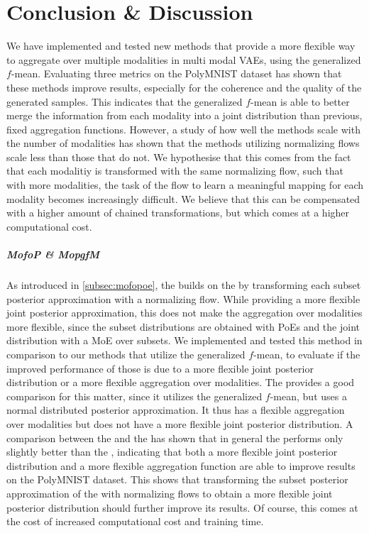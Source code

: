 \chapter{Conclusion \& Discussion}
We have implemented and tested new methods that provide a more flexible way to aggregate over multiple modalities in multi modal VAEs, using the generalized $f$-mean.
Evaluating three metrics on the PolyMNIST dataset has shown that these methods improve results, especially for the coherence and the quality of the generated samples.
This indicates that the generalized $f$-mean is able to better merge the information from each modality into a joint distribution than previous, fixed aggregation functions.
However, a study of how well the methods scale with the number of modalities has shown that the methods utilizing normalizing flows scale less than those that do not.
We hypothesise that this comes from the fact that each modalitiy is transformed with the same normalizing flow, such that with more modalities, the task of the flow to learn a meaningful mapping for each modality becomes increasingly difficult.
We believe that this can be compensated with a higher amount of chained transformations, but which comes at a higher computational cost.

\paragraph{MofoP \& MopgfM}
As introduced in \cref{subsec:mofopoe}, the  builds on the  by transforming each subset posterior approximation with a normalizing flow.
While providing a more flexible joint posterior approximation, this does not make the aggregation over modalities more flexible, since the subset distributions are obtained with PoEs and the joint distribution with a MoE over subsets.
We implemented and tested this method in comparison to our methods that utilize the generalized $f$-mean, to evaluate if the improved performance of those is due to a more flexible joint posterior distribution or a more flexible aggregation over modalities.
The  provides a good comparison for this matter, since it utilizes the generalized $f$-mean, but uses a normal distributed posterior approximation.
It thus has a flexible aggregation over modalities but does not have a more flexible joint posterior distribution.
A comparison between the  and the  has shown that in general the  performs only slightly better than the , indicating that both a more flexible joint posterior distribution and a more flexible aggregation function are able to improve results on the PolyMNIST dataset.
This shows that transforming the subset posterior approximation of the  with normalizing flows to obtain a more flexible joint posterior distribution should further improve its results.
Of course, this comes at the cost of increased computational cost and training time.

